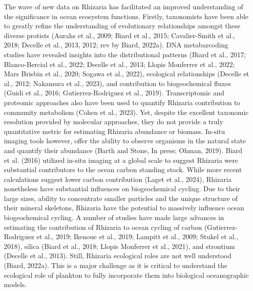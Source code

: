 \documentclass[
]{article}
\begin{document}
The wave of new data on Rhizaria has facilitated an improved
understanding of the significance in ocean ecosystem functions. Firstly,
taxonomists have been able to greatly refine the understanding of
evolutionary relationships amongst these diverse protists (Aurahs et
al., 2009; Biard et al., 2015; Cavalier-Smith et al., 2018; Decelle et
al., 2013, 2012; rev by Biard, 2022a). DNA metabarcoding studies have
revealed insights into the distributional patterns (Biard et al., 2017;
Blanco-Bercial et al., 2022; Decelle et al., 2013; Llopis Monferrer et
al., 2022; Mars Brisbin et al., 2020; Sogawa et al., 2022), ecological
relationships (Decelle et al., 2012; Nakamura et al., 2023), and
contribution to biogeochemical fluxes (Guidi et al., 2016;
Gutierrez-Rodriguez et al., 2019). Transcriptomic and proteomic
approaches also have been used to quantify Rhizaria contribution to
community metabolism (Cohen et al., 2023). Yet, despite the excellent
taxonomic resolution provided by molecular approaches, they do not
provide a truly quantitative metric for estimating Rhizaria abundance or
biomass. In-situ imaging tools however, offer the ability to observe
organisms in the natural state and quantify their abundance (Barth and
Stone, In press; Ohman, 2019). Biard et al. (2016) utilized in-situ
imaging at a global scale to suggest Rhizaria were substantial
contributors to the ocean carbon standing stock. While more recent
calculations suggest lower carbon contribution (Laget et al., 2024),
Rhizaria nonetheless have substantial influences on biogeochemical
cycling. Due to their large sizes, ability to concentrate smaller
particles and the unique structure of their mineral skeletons, Rhizaria
have the potential to massively influence ocean biogeochemical cycling.
A number of studies have made large advances in estimating the
contribution of Rhizaria to ocean cycling of carbon (Gutierrez-Rodriguez
et al., 2019; Ikenoue et al., 2019; Lampitt et al., 2009; Stukel et al.,
2018), silica (Biard et al., 2018; Llopis Monferrer et al., 2021), and
strontium (Decelle et al., 2013). Still, Rhizaria ecological roles are
not well understood (Biard, 2022a). This is a major challenge as it is
critical to understand the ecological role of plankton to fully
incorporate them into biological oceanographic models.
\end{document}
